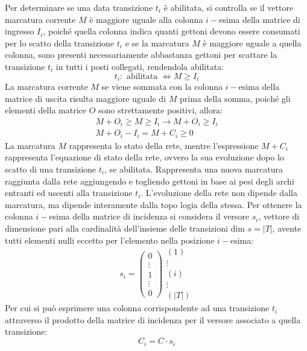 \documentclass{article}
\numberwithin{equation}{subsection}
\begin{document}
Per determinare se una data transizione $t_i$ è abilitata, si controlla se il vettore marcatura corrente $M$ è maggiore uguale alla colonna $i-$esima della matrice di ingresso 
$I_i$, poiché quella colonna indica quanti gettoni devono essere consumati per lo scatto della transizione $t_i$ e se la marcatura $M$ è maggiore uguale a quella colonna, 
sono presenti necessariamente abbastanza gettoni per scattare la transizione $t_i$ in tutti i posti collegati, rendendola abilitata:
\begin{equation*}
    t_i:\mbox{ abilitata }\iff M\geq I_i
\end{equation*}
La marcatura corrente $M$ se viene sommata con la colonna $i-$esima della matrice di uscita risulta maggiore uguale di $M$ prima della somma, poiché gli elementi della matrice 
$O$ sono strettamente positivi, allora:
\begin{gather*}
    M+O_i\geq M\geq I_i\to M+O_i\geq I_i\\
    M+O_i-I_i=M+C_i\geq 0
\end{gather*}
La marcatura $M$ rappresenta lo stato della rete, mentre l'espressione $M+C_i$ rappresenta l'equazione di stato della rete, ovvero la sua evoluzione dopo lo scatto di una 
transizione $t_i$, se abilitata. Rappresenta una nuova marcatura raggiunta dalla rete aggiungendo e togliendo gettoni in base ai pesi degli archi entranti ed uscenti alla 
transizione $t_i$. L'evoluzione della rete non dipende dalla marcatura, ma dipende interamente dalla topo logia della stessa. Per ottenere la colonna $i-$esima della matrice 
di incidenza si considera il versore $s_i$, vettore di dimensione pari alla cardinalità dell'insieme delle transizioni $\mbox{dim }s=|T|$, avente tutti elementi nulli eccetto 
per l'elemento nella posizione $i-$esima:
\begin{equation*}
    s_i=\begin{pmatrix}
        0\\
        \vdots\\
        1\\
        \vdots\\
        0
    \end{pmatrix}\begin{matrix}
        (1)\\
        \vdots\\
        (i)\\
        \vdots\\
        (|T|)
    \end{matrix}
\end{equation*}
Per cui si può esprimere una colonna corrispondente ad una transizione $t_i$ attraverso il prodotto della matrice di incidenza per il versore associato a quella transizione:
\begin{equation*}
    C_i=C\cdot s_i
\end{equation*} 
\end{document}
